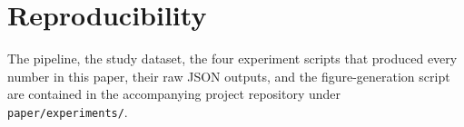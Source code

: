 \documentclass[conference]{IEEEtran}
\begin{document}
\section*{Reproducibility}

The pipeline, the study dataset, the four experiment scripts that produced
every number in this paper, their raw JSON outputs, and the figure-generation
script are contained in the accompanying project repository under
\texttt{paper/experiments/}.



\end{document}
